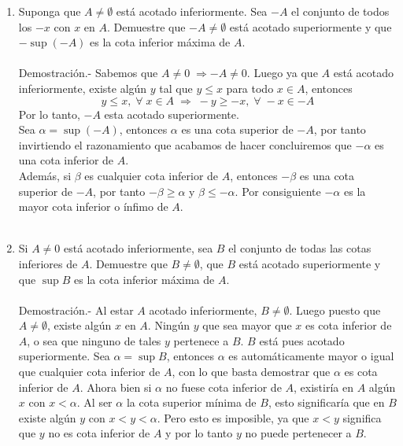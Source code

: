 \begin{enumerate}[\bfseries 1.]
\begin{enumerate}[\bfseries (a)]
	    \item Suponga que $A \neq \emptyset$ está acotado inferiormente. Sea $-A$ el conjunto de todos los $-x$ con $x$ en $A$. Demuestre que $-A\neq \emptyset$ está acotado superiormente y que $-\sup (-A)$ es la cota inferior máxima de $A$.\\\\
		Demostración.-\; Sabemos que $A\neq 0\; \Rightarrow -A\neq 0$. Luego ya que $A$ está acotado inferiormente, existe algún $y$ tal que $y\leq x$ para todo $x\in A$, entonces 
		$$y\leq x,\; \forall \; x \in A\; \Longrightarrow \; -y\geq -x, \;  \forall\;-x\in -A$$
		Por lo tanto, $-A$ esta acotado superiormente. \\
		Sea $\alpha=\sup(-A)$, entonces $\alpha$ es una cota superior de $-A$, por tanto invirtiendo el razonamiento que acabamos de hacer concluiremos que $-\alpha$ es una cota inferior de $A$.\\
		Además, si $\beta$ es cualquier cota inferior de $A$, entonces $-\beta$ es una cota superior de $-A$, por tanto $-\beta\geq \alpha$ y $\beta \leq -\alpha$. Por consiguiente $-\alpha$ es la mayor cota inferior o ínfimo de $A$.\\\\

	    \item Si $A\neq 0$ está acotado inferiormente, sea $B$ el conjunto de todas las cotas inferiores de $A$. Demuestre que $B\neq \emptyset$, que $B$ está acotado superiormente y que $\sup B$ es la cota inferior máxima de $A$.\\\\
	    Demostración.-\; Al estar $A$ acotado inferiormente, $B\neq \emptyset$. Luego puesto que $A\neq \emptyset$, existe algún $x$ en $A$. Ningún $y$ que sea mayor que $x$ es cota inferior de $A$, o sea que ninguno de tales $y$ pertenece a $B$. $B$ está pues acotado superiormente. Sea $\alpha=\sup B$, entonces $\alpha$ es automáticamente mayor o igual que cualquier cota inferior de $A$, con lo que basta demostrar que $\alpha$ es cota inferior de $A$. Ahora bien si $\alpha$ no fuese cota inferior de $A$, existiría en $A$ algún $x$ con $x<\alpha$. Al ser $\alpha$ la cota superior mínima de $B$, esto significaría que en $B$ existe algún $y$ con $x<y<\alpha$. Pero esto es imposible, ya que $x<y$ significa que $y$ no es cota inferior de $A$ y por lo tanto $y$ no puede pertenecer a $B$.\\\\


\end{enumerate}
\end{enumerate}
